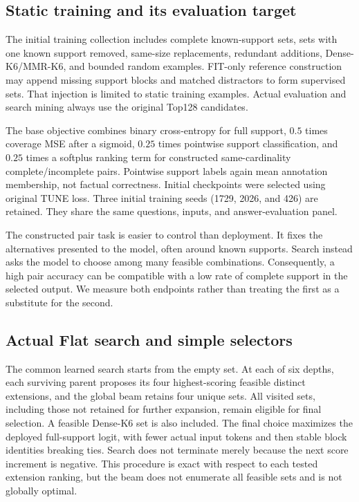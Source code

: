 \documentclass[pdflatex,sn-mathphys-num]{sn-jnl}
\begin{document}
\subsection{Static training and its evaluation target}
The initial training collection includes complete known-support sets,
sets with one known support removed, same-size replacements,
redundant additions, Dense-K6/MMR-K6, and bounded random examples.
FIT-only reference construction may append missing support blocks and
matched distractors to form supervised sets. That injection is limited to
static training examples. Actual evaluation and search mining always use
the original Top128 candidates.

The base objective combines binary cross-entropy for full support,
$0.5$ times coverage MSE after a sigmoid, $0.25$ times pointwise support
classification, and $0.25$ times a softplus ranking term for constructed
same-cardinality complete/incomplete pairs. Pointwise support labels again
mean annotation membership, not factual correctness. Initial checkpoints
were selected using original TUNE loss. Three initial training seeds
(1729, 2026, and 426) are retained. They share the same questions, inputs,
and answer-evaluation panel.

The constructed pair task is easier to control than deployment. It fixes
the alternatives presented to the model, often around known supports.
Search instead asks the model to choose among many feasible combinations.
Consequently, a high pair accuracy can be compatible with a low rate of
complete support in the selected output. We measure both endpoints rather
than treating the first as a substitute for the second.

\subsection{Actual Flat search and simple selectors}
The common learned search starts from the empty set. At each of six depths,
each surviving parent proposes its four highest-scoring feasible distinct
extensions, and the global beam retains four unique sets. All visited sets,
including those not retained for further expansion, remain eligible for
final selection. A feasible Dense-K6 set is also included. The final choice
maximizes the deployed full-support logit, with fewer actual input tokens
and then stable block identities breaking ties. Search does not terminate
merely because the next score increment is negative. This procedure is
exact with respect to each tested extension ranking, but the beam does not
enumerate all feasible sets and is not globally optimal.
\end{document}
